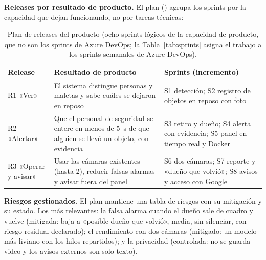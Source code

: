 \textbf{Releases por resultado de producto.} El plan () agrupa los sprints por la capacidad que dejan
funcionando, no por tareas técnicas:

\begin{table}[H]
\centering\small
\caption{Plan de releases del producto (ocho sprints lógicos de la capacidad de producto, que no son los sprints de Azure DevOps; la
Tabla~\ref{tab:sprints} asigna el trabajo a los sprints semanales de Azure DevOps).}\label{tab:releases}
\begin{tabularx}{\textwidth}{lYY}
\toprule
\textbf{Release} & \textbf{Resultado de producto} & \textbf{Sprints (incremento)} \\
\midrule
R1 «Ver» & El sistema distingue personas y maletas y sabe cuáles se dejaron en reposo & S1 detección; S2 registro de objetos en reposo con foto \\
R2 «Alertar» & Que el personal de seguridad se entere en menos de 5~s de que alguien se llevó un objeto, con evidencia & S3 retiro y dueño; S4 alerta con evidencia; S5 panel en tiempo real y Docker \\
R3 «Operar y avisar» & Usar las cámaras existentes (hasta 2), reducir falsas alarmas y avisar fuera del panel & S6 dos cámaras; S7 reporte y «dueño que volvió»; S8 avisos y acceso con Google \\
\bottomrule
\end{tabularx}
\end{table}

\textbf{Riesgos gestionados.} El plan mantiene una tabla de riesgos con su mitigación y su estado. Los más relevantes: la falsa alarma cuando
el dueño sale de cuadro y vuelve (mitigada: baja a «posible dueño que volvió», media, sin silenciar, con riesgo residual declarado); el
rendimiento con dos cámaras (mitigado: un modelo más liviano con los hilos repartidos); y la privacidad (controlada: no se guarda video y los
avisos externos son solo texto).
